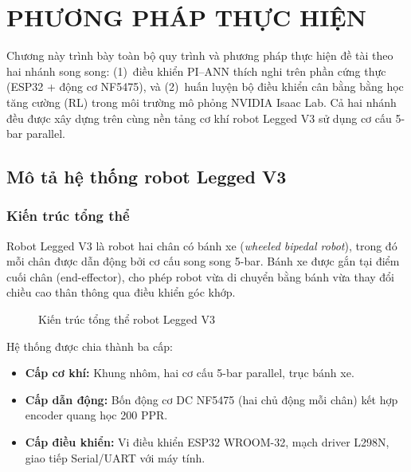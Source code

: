 
\chapter{PHƯƠNG PHÁP THỰC HIỆN}
\label{chap:phuongphap}

Chương này trình bày toàn bộ quy trình và phương pháp thực hiện đề tài theo hai
nhánh song song: (1)~điều khiển PI--ANN thích nghi trên phần cứng thực (ESP32 +
động cơ NF5475), và (2)~huấn luyện bộ điều khiển cân bằng bằng học tăng cường
(RL) trong môi trường mô phỏng NVIDIA Isaac Lab. Cả hai nhánh đều được xây dựng
trên cùng nền tảng cơ khí robot Legged V3 sử dụng cơ cấu 5-bar parallel.


\section{Mô tả hệ thống robot Legged V3}

\subsection{Kiến trúc tổng thể}

Robot Legged V3 là robot hai chân có bánh xe (\textit{wheeled bipedal robot}),
trong đó mỗi chân được dẫn động bởi cơ cấu song song 5-bar. Bánh xe được gắn
tại điểm cuối chân (end-effector), cho phép robot vừa di chuyển bằng bánh vừa
thay đổi chiều cao thân thông qua điều khiển góc khớp.

\begin{figure}[H]
    \centering
    \caption{Kiến trúc tổng thể robot Legged V3}
    \label{fig:robot_overview}
\end{figure}

Hệ thống được chia thành ba cấp:
\begin{itemize}
    \item \textbf{Cấp cơ khí:} Khung nhôm, hai cơ cấu 5-bar parallel, trục bánh xe.
    \item \textbf{Cấp dẫn động:} Bốn động cơ DC NF5475 (hai chủ động mỗi chân)
    kết hợp encoder quang học 200 PPR.
    \item \textbf{Cấp điều khiển:} Vi điều khiển ESP32 WROOM-32, mạch driver
    L298N, giao tiếp Serial/UART với máy tính.
\end{itemize}

